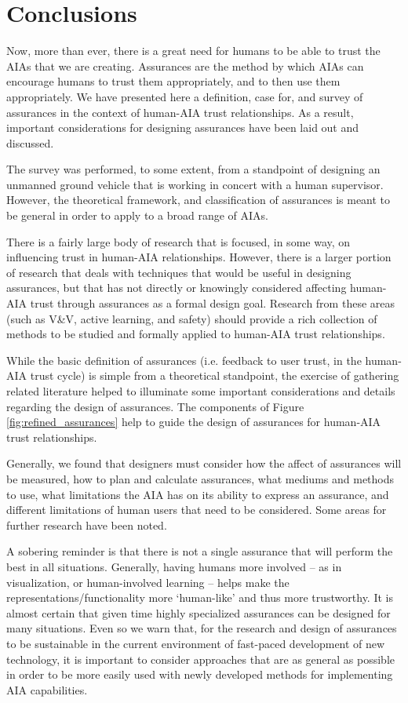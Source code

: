 \section{Conclusions}\label{sec:conclusions}
    Now, more than ever, there is a great need for humans to be able to trust the AIAs that we are creating. Assurances are the method by which AIAs can encourage humans to trust them appropriately, and to then use them appropriately. We have presented here a definition, case for, and survey of assurances in the context of human-AIA trust relationships. As a result, important considerations for designing assurances have been laid out and discussed.
    
    The survey was performed, to some extent, from a standpoint of designing an unmanned ground vehicle that is working in concert with a human supervisor. However, the theoretical framework, and classification of assurances is meant to be general in order to apply to a broad range of AIAs.

    There is a fairly large body of research that is focused, in some way, on influencing trust in human-AIA relationships. However, there is a larger portion of research that deals with techniques that would be useful in designing assurances, but that has not directly or knowingly considered affecting human-AIA trust through assurances as a formal design goal. Research from these areas (such as V\&V, active learning, and safety) should provide a rich collection of methods to be studied and formally applied to human-AIA trust relationships.

    While the basic definition of assurances (i.e. feedback to user trust, in the human-AIA trust cycle) is simple from a theoretical standpoint, the exercise of gathering related literature helped to illuminate some important considerations and details regarding the design of assurances. The components of Figure \ref{fig:refined_assurances} help to guide the design of assurances for human-AIA trust relationships.

    Generally, we found that designers must consider how the affect of assurances will be measured, how to plan and calculate assurances, what mediums and methods to use, what limitations the AIA has on its ability to express an assurance, and different limitations of human users that need to be considered. Some areas for further research have been noted.

    A sobering reminder is that there is not a single assurance that will perform the best in all situations. Generally, having humans more involved -- as in visualization, or human-involved learning -- helps make the representations/functionality more `human-like' and thus more trustworthy. It is almost certain that given time highly specialized assurances can be designed for many situations. Even so we warn that, for the research and design of assurances to be sustainable in the current environment of fast-paced development of new technology, it is important to consider approaches that are as general as possible in order to be more easily used with newly developed methods for implementing AIA capabilities.

